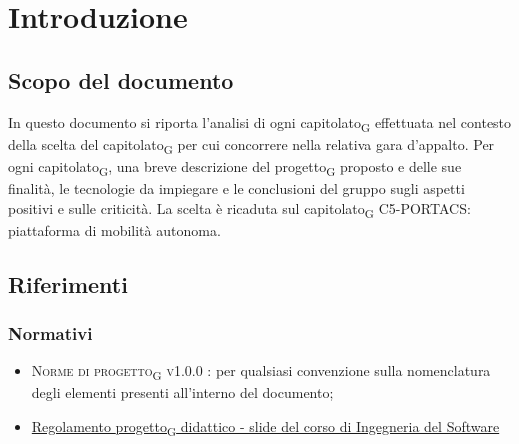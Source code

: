 \section{Introduzione}
\subsection{Scopo del documento}
In questo documento si riporta l'analisi di ogni \gls{capitolato}\textsubscript{G} effettuata nel contesto della scelta del \gls{capitolato}\textsubscript{G} per cui concorrere nella relativa gara d'appalto. Per ogni \gls{capitolato}\textsubscript{G}, una breve descrizione del \gls{progetto}\textsubscript{G} proposto e delle sue finalità, le tecnologie da impiegare e le conclusioni del gruppo sugli aspetti positivi e sulle criticità. La scelta è ricaduta sul \gls{capitolato}\textsubscript{G} C5-PORTACS: piattaforma di mobilità autonoma.


\subsection{Riferimenti}

\subsubsection{Normativi}

\begin{itemize}
	\item \textsc{Norme di \gls{progetto}\textsubscript{G} v1.0.0 }: per qualsiasi convenzione sulla nomenclatura degli elementi presenti all'interno del documento;
	\item \href{https://www.math.unipd.it/~tullio/IS-1/2020/Dispense/P1.pdf}{Regolamento \gls{progetto}\textsubscript{G} didattico - slide del corso di Ingegneria del Software} \newline 
\end{itemize}

